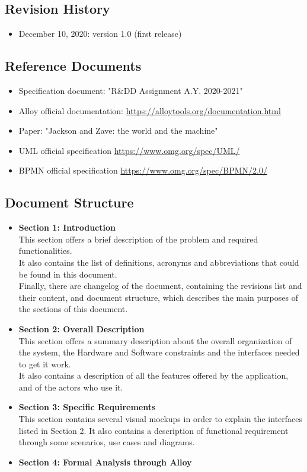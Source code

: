 \documentclass[table, 12pt]{article}
\begin{document}
\subsection{Revision History}
\begin{itemize}
    \item December 10, 2020: version 1.0 (first release)
\end{itemize}
\subsection{Reference Documents}
\begin{itemize}
    \item {Specification document: "R\&DD Assignment A.Y. 2020-2021"}
    \item {Alloy official documentation: \href{https://alloytools.org/documentation.html}{https://alloytools.org/documentation.html}}
    \item {Paper: "Jackson and Zave: the world and the machine"}
    \item {UML official specification \href{https://www.omg.org/spec/UML/}{https://www.omg.org/spec/UML/}}
    \item {BPMN official specification \href{https://www.omg.org/spec/BPMN/2.0/}{https://www.omg.org/spec/BPMN/2.0/}}
\end{itemize}
\subsection{Document Structure}
\begin{itemize}
    \item {\textbf{Section 1: Introduction}\\This section offers a brief description of the problem and required functionalities. \\It also contains the list of definitions, acronyms and abbreviations that could be found in this document. \\Finally, there are changelog of the document, containing the revisions list and their content, and document structure, which describes the main purposes of the sections of this document.}
    \item {\textbf{Section 2: Overall Description}\\This section offers a summary description about the overall organization of the system, the Hardware and Software constraints and the interfaces needed to get it work.\\It also contains a description of all the features offered by the application, and of the actors who use it.}
    \item {\textbf{Section 3: Specific Requirements}\\This section contains several visual mockups in order to explain the interfaces listed in Section 2. It also contains a description of functional requirement through some scenarios, use cases and diagrams.}
    \item {\textbf{Section 4: Formal Analysis through Alloy}}
\end{itemize}
\newpage
\end{document}
